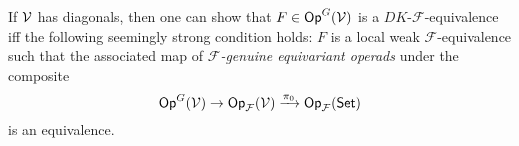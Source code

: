 \documentclass[a4paper,10pt
,draft
]{article}%
\renewcommand{\F}{\mathcal F}
\renewcommand{\1}{\eta}%
\begin{document}
\begin{remark}
      If $\mathcal V$ has diagonals, then one can show that $F \in \mathsf{Op}^G(\mathcal V)$ is a $DK$-$\F$-equivalence iff
      the following seemingly strong condition holds:
      $F$ is a local weak $\F$-equivalence such that 
      the associated map of \textit{$\F$-genuine equivariant operads} under the composite
      \begin{equation}
            \Op^G(\V) \to \Op_\F(\V) \xrightarrow{\pi_0} \Op_\F(\Set) 
      \end{equation}
      is an equivalence.
\end{remark}




  
\end{document}
